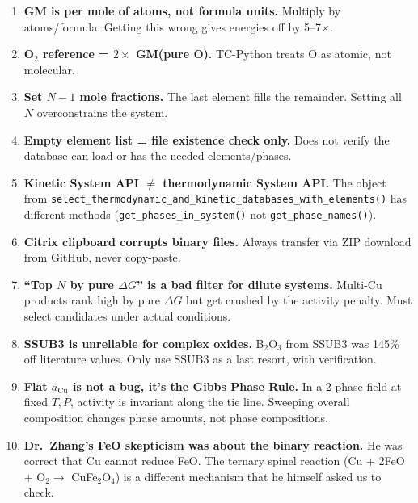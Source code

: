 \documentclass[11pt]{article}
\begin{document}
\begin{enumerate}[leftmargin=*]
    \item \textbf{GM is per mole of atoms, not formula units.} Multiply by atoms/formula. Getting this wrong gives energies off by 5--7$\times$.

    \item \textbf{O$_2$ reference = $2 \times$ GM(pure O).} TC-Python treats O as atomic, not molecular.

    \item \textbf{Set $N-1$ mole fractions.} The last element fills the remainder. Setting all $N$ overconstrains the system.

    \item \textbf{Empty element list = file existence check only.} Does not verify the database can load or has the needed elements/phases.

    \item \textbf{Kinetic System API $\neq$ thermodynamic System API.} The object from \texttt{select\_thermodynamic\_and\_kinetic\_databases\_with\_elements()} has different methods (\texttt{get\_phases\_in\_system()} not \texttt{get\_phase\_names()}).

    \item \textbf{Citrix clipboard corrupts binary files.} Always transfer via ZIP download from GitHub, never copy-paste.

    \item \textbf{``Top $N$ by pure $\Delta G$'' is a bad filter for dilute systems.} Multi-Cu products rank high by pure $\Delta G$ but get crushed by the activity penalty. Must select candidates under actual conditions.

    \item \textbf{SSUB3 is unreliable for complex oxides.} B$_2$O$_3$ from SSUB3 was 145\% off literature values. Only use SSUB3 as a last resort, with verification.

    \item \textbf{Flat $a_{\text{Cu}}$ is not a bug, it's the Gibbs Phase Rule.} In a 2-phase field at fixed $T, P$, activity is invariant along the tie line. Sweeping overall composition changes phase amounts, not phase compositions.

    \item \textbf{Dr.\ Zhang's FeO skepticism was about the binary reaction.} He was correct that Cu cannot reduce FeO. The ternary spinel reaction (Cu $+$ 2FeO $+$ O$_2 \to$ CuFe$_2$O$_4$) is a different mechanism that he himself asked us to check.
\end{enumerate}
\end{document}
